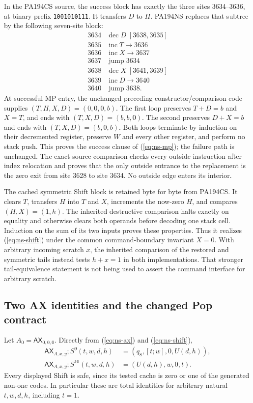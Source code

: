 In the PA194CS source, the success block has exactly the three sites
3634--3636, at binary prefix \texttt{1001010111}. It transfers $D$ to $H$.
PA194NS replaces that subtree by the following seven-site block:
\[
\begin{array}{r|l}
3634&\operatorname{dec}D\;[3638,3635]\\
3635&\operatorname{inc}T\to3636\\
3636&\operatorname{inc}X\to3637\\
3637&\operatorname{jump}3634\\
3638&\operatorname{dec}X\;[3641,3639]\\
3639&\operatorname{inc}D\to3640\\
3640&\operatorname{jump}3638.
\end{array}
\]
At successful MP entry, the unchanged preceding constructor/comparison
code supplies $(T,H,X,D)=(0,0,0,b)$. The first loop preserves
$T+D=b$ and $X=T$, and ends with $(T,X,D)=(b,b,0)$.
The second preserves $D+X=b$ and ends with $(T,X,D)=(b,0,b)$.
Both loops terminate by induction on their decremented register, preserve
$W$ and every other register, and perform no stack push. This proves the
success clause of (\ref{eq:ns-mp}); the failure path is unchanged.
The exact source comparison checks every outside instruction after index
relocation and proves that the only outside entrance to the replacement
is the zero exit from site 3628 to site 3634. No outside edge enters its
interior.

The cached symmetric Shift block is retained byte for byte from PA194CS.
It clears $T$, transfers $H$ into $T$ and $X$, increments the now-zero $H$,
and compares $(H,X)=(1,h)$. The inherited destructive comparison halts
exactly on equality and otherwise clears both operands before decoding
one stack cell. Induction on the sum of its two inputs proves these
properties. Thus it realizes (\ref{eq:ns-shift}) under the common command-boundary
invariant $X=0$. With arbitrary incoming scratch $x$, the inherited
comparison of the restored and symmetric tails instead tests $h+x=1$
in both implementations. That stronger tail-equivalence statement is not
being used to assert the command interface for arbitrary scratch.

\subsection{Two AX identities and the changed Pop contract}

Let $A_0=\mathsf{AX}_{0,0,0}$. Directly from
(\ref{eq:ns-ax}) and (\ref{eq:ns-shift}),
\begin{align}
 \mathsf{AX}_{A,x,y};S^9(t,w,d,h)
   &=(q_8,[t;w],0,U(d,h)),\label{eq:ns-nine}\\
 \mathsf{AX}_{A,x,y};S^{10}(t,w,d,h)
   &=(U(d,h),w,0,t).\label{eq:ns-ten}
\end{align}
Every displayed Shift is safe, since its tested cache is zero or one of
the generated non-one codes. In particular these are total identities
for arbitrary natural $t,w,d,h$, including $t=1$.


